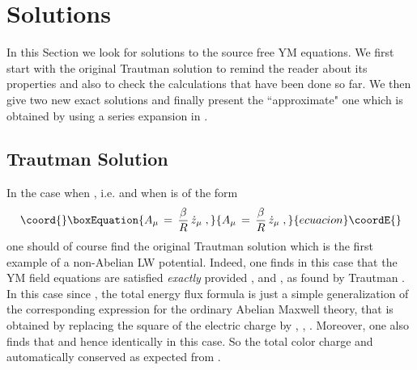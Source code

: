 \documentclass[a4paper,twocolumn,prd,showpacs,amsmath,amssymb]{revtex4}
\begin{document}
\section{\label{sols} Solutions}

In this Section we look for solutions to the source free YM equations. We first
start with the original Trautman solution to remind the reader about its
properties and also to check the calculations that have been done so far.
We then give two new exact solutions and finally present the ``approximate" one
which is obtained by using a series expansion in \coordHE{}.

\subsection{\label{trasol} Trautman Solution}

In the case when \coordHE{}, i.e. \coordHE{} and
when \coordHE{} is of the form
\begin{equation}\coord{}\boxEquation{
A_{\mu} \, = \, \frac{\beta}{R} \, \dot{z}_{\mu} \; ,
\label{solseca}
}{
A_{\mu} \, = \, \frac{\beta}{R} \, \dot{z}_{\mu} \; ,
}{ecuacion}\coordE{}\end{equation}
one should of course find the original Trautman solution which is the first
example of a non-Abelian LW potential. Indeed, one finds in this case that
the YM field equations \coordHE{} are satisfied {\it exactly}
provided \coordHE{}, \coordHE{}
and \coordHE{},
as found by Trautman \cite{traut}. In this case since \coordHE{}, the total
energy flux formula \coordHE{} is just a simple generalization of the
corresponding expression for the ordinary Abelian Maxwell theory, that is
obtained by replacing the square of the electric charge by \coordHE{}
\cite{bar}, \cite{traut}, \cite{gs1}. Moreover, one also finds that
\coordHE{}
and hence \coordHE{} identically in
this case. So the total color charge \coordHE{} and automatically conserved as
expected from \cite{traut}.
\end{document}
